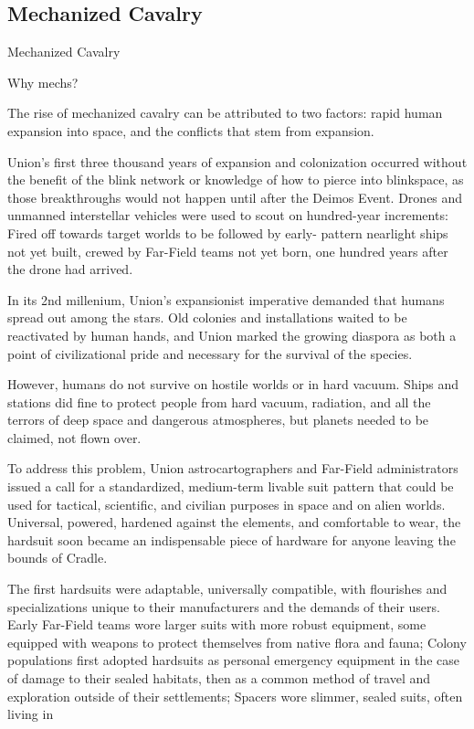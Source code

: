 \subsection{Mechanized Cavalry}
Mechanized Cavalry  

Why mechs? 
 

The rise of mechanized cavalry can be attributed to two factors: rapid human expansion into  
space, and the conflicts that stem from expansion. 
 

Union’s first three thousand years of expansion and colonization occurred without the benefit of  
the blink network or knowledge of how to pierce into blinkspace, as those breakthroughs would  
not happen until after the Deimos Event. Drones and unmanned interstellar vehicles were used to  
scout on hundred-year increments: Fired off towards target worlds to be followed by early- 
pattern nearlight ships not yet built, crewed by Far-Field teams not yet born, one hundred years  
after the drone had arrived.
 

In its 2nd millenium, Union’s expansionist imperative demanded that humans spread out among  
the stars. Old colonies and installations waited to be reactivated by human hands, and Union  
marked the growing diaspora as both a point of civilizational pride and necessary for the survival  
of the species. 
 

However, humans do not survive on hostile worlds or in hard vacuum. Ships and stations did fine  
to protect people from hard vacuum, radiation, and all the terrors of deep space and dangerous  
atmospheres, but planets needed to be claimed, not flown over.
 

To address this problem, Union astrocartographers and Far-Field administrators issued a call for  
a standardized, medium-term livable suit pattern that could be used for tactical, scientific, and  
civilian purposes in space and on alien worlds. Universal, powered, hardened against the  
elements, and comfortable to wear, the hardsuit soon became an indispensable piece of  
hardware for anyone leaving the bounds of Cradle. 
 

The first hardsuits were adaptable, universally compatible, with flourishes and specializations  
unique to their manufacturers and the demands of their users. Early Far-Field teams wore larger  
suits with more robust equipment, some equipped with weapons to protect themselves from  
native flora and fauna; Colony populations first adopted hardsuits as personal emergency  
equipment in the case of damage to their sealed habitats, then as a common method of travel  
and exploration outside of their settlements; Spacers wore slimmer, sealed suits, often living in  

